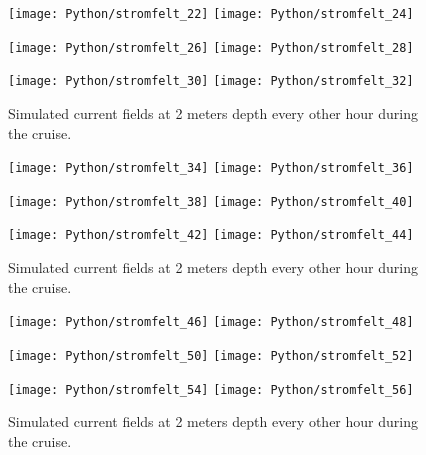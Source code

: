 \documentclass[12pt,a4paper,english]{article}
\begin{document}
\begin{figure}[h]
\centerline{
\texttt{[image: Python/stromfelt\_22]}
\texttt{[image: Python/stromfelt\_24]}
}
\centerline{
\texttt{[image: Python/stromfelt\_26]}
\texttt{[image: Python/stromfelt\_28]}
}
\centerline{
\texttt{[image: Python/stromfelt\_30]}
\texttt{[image: Python/stromfelt\_32]}
}
\caption{\small 
Simulated current fields at 2 meters depth every other hour during the cruise.}
\label{fig:Current2}
\end{figure}

\begin{figure}[h]
\centerline{
\texttt{[image: Python/stromfelt\_34]}
\texttt{[image: Python/stromfelt\_36]}
}
\centerline{
\texttt{[image: Python/stromfelt\_38]}
\texttt{[image: Python/stromfelt\_40]}
}
\centerline{
\texttt{[image: Python/stromfelt\_42]}
\texttt{[image: Python/stromfelt\_44]}
}
\caption{\small
Simulated current fields at 2 meters depth every other hour during the cruise.}
\label{fig:Current3}
\end{figure}

\begin{figure}[h]
\centerline{
\texttt{[image: Python/stromfelt\_46]}
\texttt{[image: Python/stromfelt\_48]}
}
\centerline{
\texttt{[image: Python/stromfelt\_50]}
\texttt{[image: Python/stromfelt\_52]}
}
\centerline{
\texttt{[image: Python/stromfelt\_54]}
\texttt{[image: Python/stromfelt\_56]}
}
\caption{\small
Simulated current fields at 2 meters depth every other hour during the cruise.}
\label{fig:Current4}
\end{figure}




\clearpage
\pagebreak

%

\clearpage
\pagebreak
 
\end{document}
